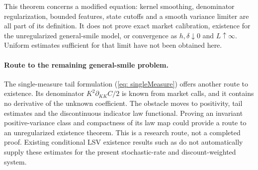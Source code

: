 This theorem concerns a modified equation: kernel smoothing, denominator
regularization, bounded features, state cutoffs and a smooth variance limiter
are all part of its definition. It does not prove exact market calibration,
existence for the unregularized general-smile model, or convergence as
$h,\delta\downarrow0$ and $L\uparrow\infty$. Uniform estimates sufficient
for that limit have not been obtained here.

\paragraph{Route to the remaining general-smile problem.}
The single-measure tail formulation (\ref{eq: singleMeasure}) offers another
route to existence. Its denominator $K^2\partial_{KK}C/2$ is known from
market calls, and it contains no derivative of the unknown coefficient.
The obstacle moves to positivity, tail estimates and the discontinuous
indicator law functional. Proving an invariant positive-variance class and
compactness of its law map could provide a route to an unregularized existence
theorem. This is a research route, not a completed proof. Existing conditional
LSV existence results such as \cite{djete,mustapha} do not automatically supply
these estimates for the present stochastic-rate and discount-weighted system.
